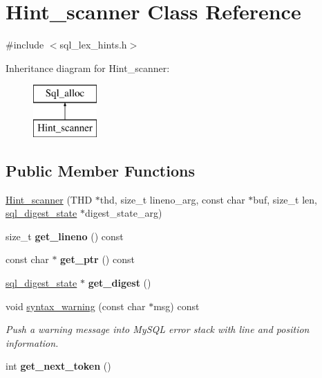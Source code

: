 \hypertarget{classHint__scanner}{}\section{Hint\+\_\+scanner Class Reference}
\label{classHint__scanner}


{\ttfamily \#include $<$sql\+\_\+lex\+\_\+hints.\+h$>$}

Inheritance diagram for Hint\+\_\+scanner\+:\begin{figure}[H]
\begin{center}
\leavevmode
\includegraphics[height=2.000000cm]{classHint__scanner}
\end{center}
\end{figure}
\subsection*{Public Member Functions}
\begin{DoxyCompactItemize}
\item 
\mbox{\hyperlink{classHint__scanner_a0fc7dc3dff1f3e65d8c744cbb39134af}{Hint\+\_\+scanner}} (T\+HD $\ast$thd, size\+\_\+t lineno\+\_\+arg, const char $\ast$buf, size\+\_\+t len, \mbox{\hyperlink{structsql__digest__state}{sql\+\_\+digest\+\_\+state}} $\ast$digest\+\_\+state\+\_\+arg)
\item 
\mbox{\label{classHint__scanner_a65c1aa79ed2d14d4ab385af21842a696}} 
size\+\_\+t {\bfseries get\+\_\+lineno} () const
\item 
\mbox{\label{classHint__scanner_a14d9a76b7766e671100c4474296e00a8}} 
const char $\ast$ {\bfseries get\+\_\+ptr} () const
\item 
\mbox{\label{classHint__scanner_add8cf1b2a6c2dd0f414a3fe29aa316ee}} 
\mbox{\hyperlink{structsql__digest__state}{sql\+\_\+digest\+\_\+state}} $\ast$ {\bfseries get\+\_\+digest} ()
\item 
void \mbox{\hyperlink{classHint__scanner_adb3502bdcfb4f709c6fd089bdb171590}{syntax\+\_\+warning}} (const char $\ast$msg) const
\begin{DoxyCompactList}\small\item\em Push a warning message into My\+S\+QL error stack with line and position information. \end{DoxyCompactList}\item 
\mbox{\label{classHint__scanner_af7c0d8224e9d3fd76dbd174584a9fc4f}} 
int {\bfseries get\+\_\+next\+\_\+token} ()
\end{DoxyCompactItemize}

